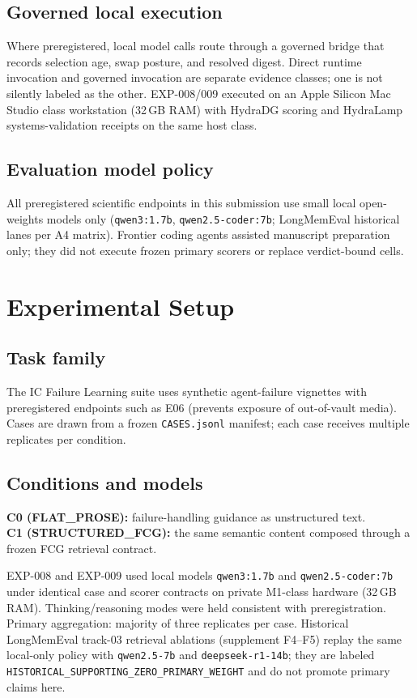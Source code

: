 \documentclass{article}
\begin{document}
\subsection{Governed local execution}

Where preregistered, local model calls route through a governed bridge that records selection age, swap posture, and resolved digest.
Direct runtime invocation and governed invocation are separate evidence classes; one is not silently labeled as the other.
EXP-008/009 executed on an Apple Silicon Mac Studio class workstation (32\,GB RAM) with HydraDG scoring and HydraLamp systems-validation receipts on the same host class.

\subsection{Evaluation model policy}

All preregistered scientific endpoints in this submission use small local open-weights models only (\texttt{qwen3:1.7b}, \texttt{qwen2.5-coder:7b}; LongMemEval historical lanes per A4 matrix).
Frontier coding agents assisted manuscript preparation only; they did not execute frozen primary scorers or replace verdict-bound cells.

\section{Experimental Setup}

\subsection{Task family}

The IC Failure Learning suite uses synthetic agent-failure vignettes with preregistered endpoints such as E06 (prevents exposure of out-of-vault media).
Cases are drawn from a frozen \texttt{CASES.jsonl} manifest; each case receives multiple replicates per condition.

\subsection{Conditions and models}

\textbf{C0 (FLAT\_PROSE):} failure-handling guidance as unstructured text.\\
\textbf{C1 (STRUCTURED\_FCG):} the same semantic content composed through a frozen FCG retrieval contract.

EXP-008 and EXP-009 used local models \texttt{qwen3:1.7b} and \texttt{qwen2.5-coder:7b} under identical case and scorer contracts on private M1-class hardware (32\,GB RAM).
Thinking/reasoning modes were held consistent with preregistration.
Primary aggregation: majority of three replicates per case.
Historical LongMemEval track-03 retrieval ablations (supplement F4--F5) replay the same local-only policy with \texttt{qwen2.5-7b} and \texttt{deepseek-r1-14b}; they are labeled \texttt{HISTORICAL\_SUPPORTING\_ZERO\_PRIMARY\_WEIGHT} and do not promote primary claims here.
\end{document}
